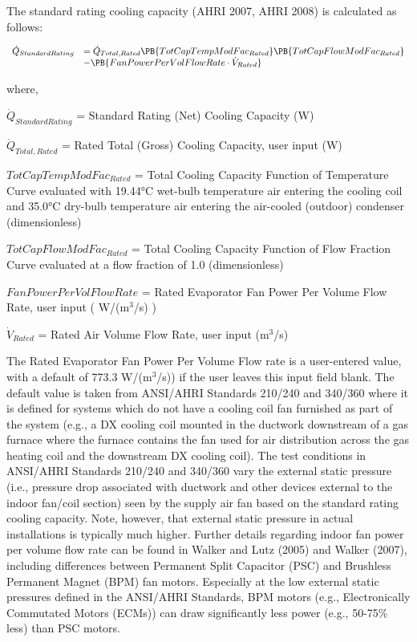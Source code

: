 The standard rating cooling capacity (AHRI 2007, AHRI 2008) is calculated as follows:

\begin{equation}
  \begin{array}{rl}
    \dot{Q}_{StandardRating} & = \dot{Q}_{Total,Rated}\PB{TotCapTempModFac_{Rated}}\PB{TotCapFlowModFac_{Rated}} \\
                             & - \PB{FanPowerPerVolFlowRate \cdot \dot{V}_{Rated}}
  \end{array}
\end{equation}

where,

\({\dot Q_{StandardRating}}\) = Standard Rating (Net) Cooling Capacity (W)

\({\dot Q_{Total,Rated}}\) = Rated Total (Gross) Cooling Capacity, user input (W)

\(TotCapTempModFa{c_{Rated}}\) = Total Cooling Capacity Function of Temperature Curve evaluated with 19.44°C wet-bulb temperature air entering the cooling coil and 35.0°C dry-bulb temperature air entering the air-cooled (outdoor) condenser (dimensionless)

\(TotCapFlowModFa{c_{Rated}}\) = Total Cooling Capacity Function of Flow Fraction Curve evaluated at a flow fraction of 1.0 (dimensionless)

\(FanPowerPerVolFlowRate\) = Rated Evaporator Fan Power Per Volume Flow Rate, user input ( W/(m\(^{3}\)/s) )

\({\dot V_{Rated}}\) = Rated Air Volume Flow Rate, user input (m\(^{3}\)/s)

The Rated Evaporator Fan Power Per Volume Flow rate is a user-entered value, with a default of 773.3 W/(m\(^{3}\)/s)) if the user leaves this input field blank. The default value is taken from ANSI/AHRI Standards 210/240 and 340/360 where it is defined for systems which do not have a cooling coil fan furnished as part of the system (e.g., a DX cooling coil mounted in the ductwork downstream of a gas furnace where the furnace contains the fan used for air distribution across the gas heating coil and the downstream DX cooling coil). The test conditions in ANSI/AHRI Standards 210/240 and 340/360 vary the external static pressure (i.e., pressure drop associated with ductwork and other devices external to the indoor fan/coil section) seen by the supply air fan based on the standard rating cooling capacity. Note, however, that external static pressure in actual installations is typically much higher. Further details regarding indoor fan power per volume flow rate can be found in Walker and Lutz (2005) and Walker (2007), including differences between Permanent Split Capacitor (PSC) and Brushless Permanent Magnet (BPM) fan motors. Especially at the low external static pressures defined in the ANSI/AHRI Standards, BPM motors (e.g., Electronically Commutated Motors (ECMs)) can draw significantly less power (e.g., 50-75\% less) than PSC motors.

